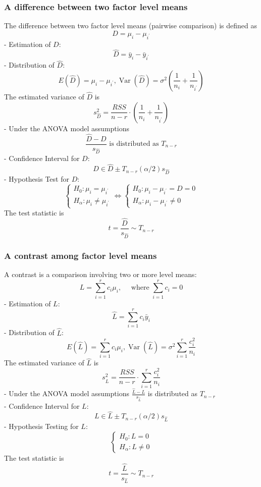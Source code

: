 \documentclass[11pt,a4paper]{article}
\begin{document}
\subsubsection{A difference between two factor level means}
The difference between two factor level means (pairwise comparison) is defined as
$$
D=\mu_{i}-\mu_{i^{\prime}}
$$
- Estimation of $D$: $$\hat{D}=\bar{y}_{i}-\bar{y}_{i^{\prime}}$$
- Distribution of $\hat{D}$: $$E(\hat{D})=\mu_{i}-\mu_{i^{\prime}}, \operatorname{Var}(\hat{D})=\sigma^{2}\left(\frac{1}{n_{i}}+\frac{1}{n_{i^{\prime}}}\right)$$
The estimated variance of $\hat{D}$ is
$$
s_{\hat{D}}^{2}=\frac{R S S}{n-r} \cdot\left(\frac{1}{n_{i}}+\frac{1}{n_{i^{\prime}}}\right)
$$
- Under the ANOVA model assumptions
$$
\frac{\hat{D}-D}{s_{\hat{D}}} \text { is distributed as } T_{n-r}
$$
- Confidence Interval for $D$: $$D \in \hat{D}\pm T_{n-r}(\alpha / 2) s_{\hat{D}}$$
- Hypothesis Test for $D:$
$$
\left\{\begin{array} { l } 
{ H _ { 0 } : \mu _ { i } = \mu _ { i ^ { \prime } } } \\
{ H _ { \alpha } : \mu _ { i } \neq \mu _ { i ^ { \prime } } }
\end{array} \Leftrightarrow \left\{\begin{array}{l}
H_{0}: \mu_{i}-\mu_{i^{\prime}}=D=0 \\
H_{\alpha}: \mu_{i}-\mu_{i^{\prime}} \neq 0
\end{array}\right.\right.
$$
The test statistic is $$t=\frac{\hat{D}}{s_{\hat{D}}} \sim T_{n-r}$$





\subsubsection{A contrast among factor level means}
A contrast is a comparison involving two or more level means:
$$
L=\sum_{i=1}^{r} c_{i} \mu_{i}, \quad \text { where } \sum_{i=1}^{r} c_{i}=0
$$
- Estimation of $L$: $$\hat{L}=\sum_{i=1}^{r} c_{i} \bar{y}_{i}$$
- Distribution of $\hat{L}$: $$E(\hat{L})=\sum_{i=1}^{r} c_{i} \mu_{i}, \operatorname{Var}(\hat{L})=\sigma^{2} \sum_{i=1}^{r} \frac{c_{i}^{2}}{n_{i}}$$
The estimated variance of $\hat{L}$ is
$$
s_{\hat{L}}^{2}=\frac{R S S}{n-r} \cdot \sum_{i=1}^{r} \frac{c_{i}^{2}}{n_{i}}
$$
- Under the ANOVA model assumptions
$\frac{\hat{L}-L}{s_{\hat{L}}}$ is distributed as $T_{n-r}$\\
- Confidence Interval for $L$: $$L \in \hat{L}\pm T_{n-r}(\alpha / 2) s_{\hat{L}}$$
- Hypothesis Testing for $L:$
$$
\left\{\begin{array}{l}
H_{0}: L=0 \\
H_{\alpha}: L \neq 0
\end{array}\right.
$$
The test statistic is $$t=\frac{\hat{L}}{s_{\hat{L}}} \sim T_{n-r}$$
\end{document}
